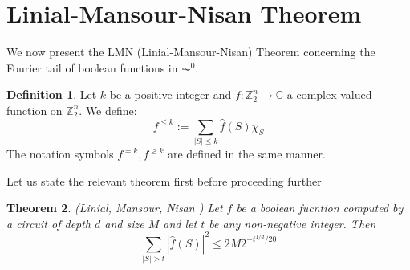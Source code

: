 \documentclass{amsart}
\newtheorem{theorem}{Theorem}[section]
\theoremstyle{definition}
\newtheorem{definition}[theorem]{Definition}
\theoremstyle{remark}
\numberwithin{equation}{section}
\theoremstyle{remark}
\begin{document}
\section{Linial-Mansour-Nisan Theorem}
We now present the LMN (Linial-Mansour-Nisan) Theorem concerning the Fourier tail of boolean functions in $\AC^0$.
\begin{definition}
  Let $k$ be a positive integer and $f:\mathbb{Z}_2^n \rightarrow \mathbb{C}$ a complex-valued function on $\mathbb{Z}_2^n$. We define: \newline
  $$f^{\leq k} := \sum_{|S| \leq k} \hat{f}(S)\chi_{S} $$
  The notation symbols $f^{=k},f^{\geq k}$ are defined in the same manner.
\end{definition}
%
Let us state the relevant theorem first before proceeding further
%
\begin{theorem} (Linial, Mansour, Nisan \cite{lmn}) \label{lmn}
    Let $f$ be a boolean fucntion computed by a circuit of depth $d$ and size $M$ and let $t$ be any non-negative integer. Then
    \begin{equation}
      \sum_{|S| > t} |\hat{f}(S)|^2 \leq 2M2^{-t^{1/d}/20}
    \end{equation}
\end{theorem}
\end{document}
